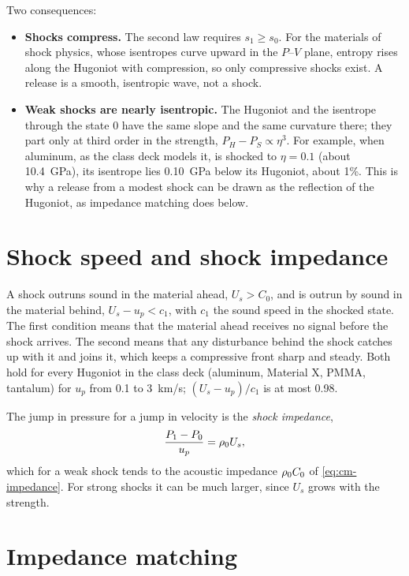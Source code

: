 Two consequences:

\begin{itemize}
\item \textbf{Shocks compress.} The second law requires $s_1 \ge s_0$. For
  the materials of shock physics, whose isentropes curve upward in the
  $P$--$V$ plane, entropy rises along the Hugoniot with compression, so
  only compressive shocks exist. A release is a smooth, isentropic wave, not
  a shock.
\item \textbf{Weak shocks are nearly isentropic.} The Hugoniot and the
  isentrope through the state 0 have the same slope and the same curvature
  there; they part only at third order in the strength, $P_H - P_S \propto
  \eta^3$. For example, when aluminum, as the class deck models it, is
  shocked to $\eta = 0.1$ (about 10.4~GPa), its isentrope lies 0.10~GPa
  below its Hugoniot, about 1\%. This is why a
  release from a modest shock can be drawn as the reflection of the
  Hugoniot, as impedance matching does below.
\end{itemize}

\section{Shock speed and shock impedance}
\label{sec:shock-impedance}

A shock outruns sound in the material ahead, $U_s > C_0$, and is
outrun by sound in the material behind, $U_s - u_p < c_1$, with $c_1$ the
sound speed in the shocked state. The first condition means that the
material ahead receives no signal before the shock arrives. The second
means that any disturbance behind the shock catches up with it and joins
it, which keeps a compressive front sharp and steady. Both hold for every
Hugoniot in the class deck (aluminum, Material X, PMMA, tantalum) for
$u_p$ from 0.1 to 3~km/s; $(U_s - u_p)/c_1$ is at most 0.98.

The jump in pressure for a jump in velocity is the \emph{shock
impedance},
\begin{equation}
\frac{P_1 - P_0}{u_p} = \rho_0 U_s ,
\label{eq:sh-impedance}
\end{equation}
which for a weak shock tends to the acoustic impedance $\rho_0 C_0$ of
\cref{eq:cm-impedance}. For strong shocks it can be much larger, since
$U_s$ grows with the strength.

\section{Impedance matching}
\label{sec:impedance-matching}

